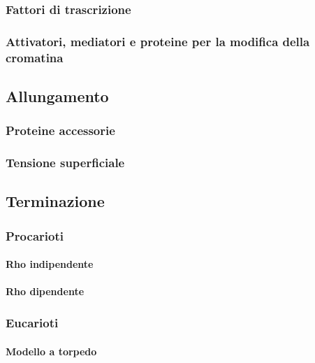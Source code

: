 		\subsubsection{Fattori di trascrizione}

		\subsubsection{Attivatori, mediatori e proteine per la modifica della cromatina}

	\subsection{Allungamento}

		\subsubsection{Proteine accessorie}

		\subsubsection{Tensione superficiale}


	\subsection{Terminazione}

		\subsubsection{Procarioti}

			\paragraph{Rho indipendente}

			\paragraph{Rho dipendente}

		\subsubsection{Eucarioti}

			\paragraph{Modello a torpedo}

